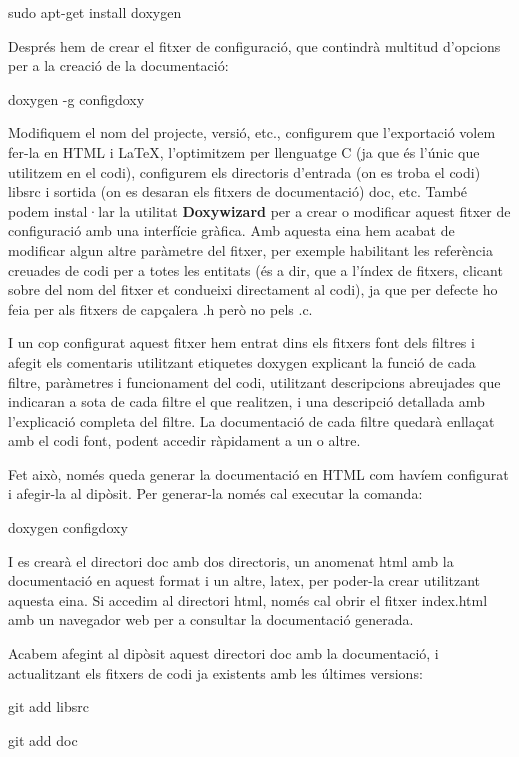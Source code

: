 \documentclass{article}
\begin{document}
\qquad sudo apt-get install doxygen\bigskip

Després hem de crear el fitxer de configuració, que contindrà multitud d'opcions per a la creació de la documentació:\bigskip

\qquad doxygen -g configdoxy\bigskip

Modifiquem el nom del projecte, versió, etc., configurem que l'exportació volem fer-la en HTML i LaTeX, l'optimitzem per llenguatge C (ja que és l'únic que utilitzem en el codi), configurem els directoris d'entrada (on es troba el codi) libsrc i sortida (on es desaran els fitxers de documentació) doc, etc. També podem instal·lar la utilitat \textbf{Doxywizard} per a crear o modificar aquest fitxer de configuració amb una interfície gràfica. Amb aquesta eina hem acabat de modificar algun altre paràmetre del fitxer, per exemple habilitant les referència creuades de codi per a totes les entitats (és a dir, que a l'índex de fitxers, clicant sobre del nom del fitxer et condueixi directament al codi), ja que per defecte ho feia per als fitxers de capçalera .h però no pels .c.\bigskip

I un cop configurat aquest fitxer hem entrat dins els fitxers font dels filtres i afegit els comentaris utilitzant etiquetes doxygen explicant la funció de cada filtre, paràmetres i funcionament del codi, utilitzant descripcions abreujades que indicaran a sota de cada filtre el que realitzen, i una descripció detallada amb l'explicació completa del filtre. La documentació de cada filtre quedarà enllaçat amb el codi font, podent accedir ràpidament a un o altre.\bigskip

Fet això, només queda generar la documentació en HTML com havíem configurat i afegir-la al dipòsit. Per generar-la només cal executar la comanda:\bigskip

\qquad doxygen configdoxy\bigskip

I es crearà el directori doc amb dos directoris, un anomenat html amb la documentació en aquest format i un altre, latex, per poder-la crear utilitzant aquesta eina. Si accedim al directori html, només cal obrir el fitxer index.html amb un navegador web per a consultar la documentació generada.\bigskip

Acabem afegint al dipòsit aquest directori doc amb la documentació, i actualitzant els fitxers de codi ja existents amb les últimes versions:\bigskip

\qquad git add libsrc\bigskip

\qquad git add doc\bigskip
\end{document}
